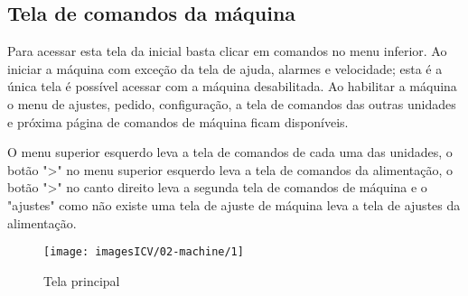 \usepackage{graphicx}\thispagestyle{fancy}
\vspace*{\fill}
\subsection{Tela de comandos da máquina}
Para acessar esta tela da inicial basta clicar em comandos no menu inferior. Ao iniciar a máquina com exceção da tela de ajuda, alarmes e velocidade; esta é a única tela é possível acessar com a máquina desabilitada. Ao habilitar a máquina o menu de ajustes, pedido, configuração, a tela de comandos das outras unidades e próxima página de comandos de máquina ficam disponíveis.

O menu superior esquerdo leva a tela de comandos de cada uma das unidades, o botão "\textgreater" no menu superior esquerdo leva a tela de comandos da alimentação, o botão "\textgreater" no canto direito leva a segunda tela de comandos de máquina e o "ajustes" como não existe uma tela de ajuste de máquina leva a tela de ajustes da alimentação.
\vspace*{10pt}

\begin{figure}
    \centering
    \texttt{[image: imagesICV/02-machine/1]}
    \caption{Tela principal}
    \label{fig:}
\end{figure}
\newpage
\thispagestyle{fancy}
\vspace{\fill}

